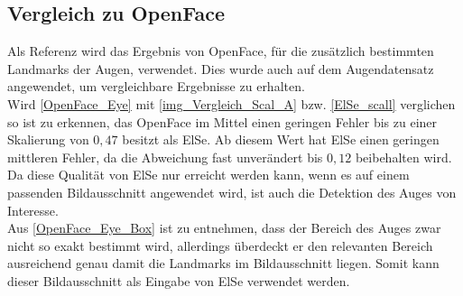 \subsection{Vergleich zu OpenFace}
Als Referenz wird das Ergebnis von OpenFace, für die zusätzlich bestimmten Landmarks der Augen, verwendet. Dies wurde auch auf dem Augendatensatz \cite{database_Eye} angewendet, um vergleichbare Ergebnisse zu erhalten.\\
Wird \autoref{OpenFace_Eye} mit \autoref{img_Vergleich_Scal_A} bzw. \autoref{ElSe_scall} verglichen so ist zu erkennen, das OpenFace im Mittel einen geringen Fehler bis zu einer Skalierung von $0,47$ besitzt als ElSe. Ab diesem Wert hat ElSe einen geringen mittleren Fehler, da die Abweichung fast unverändert bis $0,12$ beibehalten wird.\\
Da diese Qualität von ElSe nur erreicht werden kann, wenn es auf einem passenden Bildausschnitt angewendet wird, ist auch die Detektion des Auges von Interesse.\\
Aus \autoref{OpenFace_Eye_Box} ist zu entnehmen, dass der Bereich des Auges zwar nicht so exakt bestimmt wird, allerdings überdeckt er den relevanten Bereich ausreichend genau damit die Landmarks im Bildausschnitt liegen. Somit kann dieser Bildausschnitt als Eingabe von ElSe verwendet werden.
